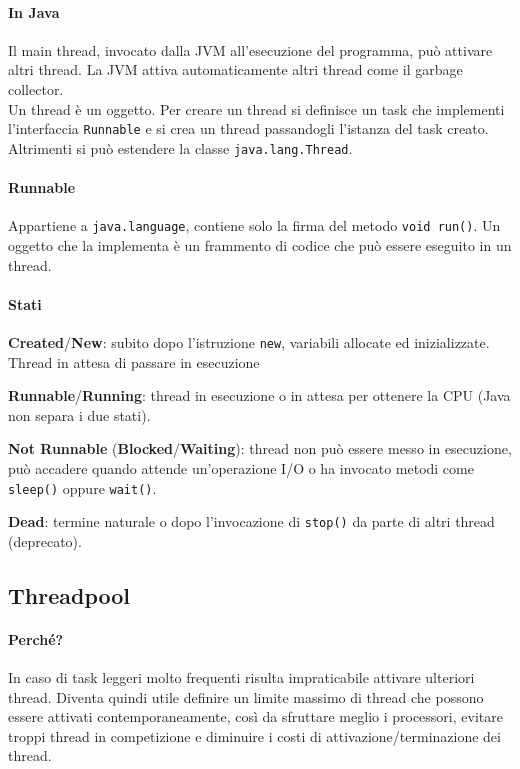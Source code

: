 \documentclass[10pt]{article}
\begin{document}
\paragraph{In Java} Il main thread, invocato dalla JVM all'esecuzione del programma, può attivare altri thread. La JVM attiva automaticamente altri thread come il garbage collector.\\
Un thread è un oggetto. Per creare un thread si definisce un task che implementi l'interfaccia \texttt{Runnable} e si crea un thread passandogli l'istanza del task creato. Altrimenti si può estendere la classe \texttt{java.lang.Thread}.
\paragraph{Runnable} Appartiene a \texttt{java.language}, contiene solo la firma del metodo \texttt{void run()}. Un oggetto che la implementa è un frammento di codice che può essere eseguito in un thread.
\paragraph{Stati}
\begin{list}{}{}
	\item \textbf{Created}/\textbf{New}: subito dopo l'istruzione \texttt{new}, variabili allocate ed inizializzate. Thread in attesa di passare in esecuzione
	\item \textbf{Runnable}/\textbf{Running}: thread in esecuzione o in attesa per ottenere la CPU (Java non separa i due stati).
	\item \textbf{Not Runnable} (\textbf{Blocked}/\textbf{Waiting}): thread non può essere messo in esecuzione, può accadere quando attende un'operazione I/O o ha invocato metodi come \texttt{sleep()} oppure \texttt{wait()}.
	\item \textbf{Dead}: termine naturale o dopo l'invocazione di \texttt{stop()} da parte di altri thread (deprecato).
\end{list}
\subsection{Threadpool}
\paragraph{Perché?} In caso di task leggeri molto frequenti risulta impraticabile attivare ulteriori thread. Diventa quindi utile definire un limite massimo di thread che possono essere attivati contemporaneamente, così da sfruttare meglio i processori, evitare troppi thread in competizione e diminuire i costi di attivazione/terminazione dei thread.
\end{document}
